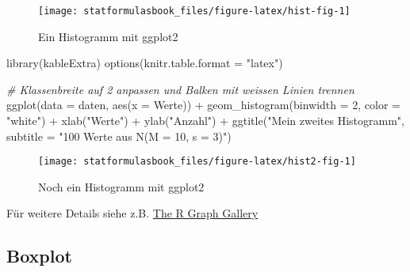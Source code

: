 \documentclass[
]{book}
\newenvironment{Shaded}{\begin{snugshade}}{\end{snugshade}}
\newcommand{\AttributeTok}[1]{\textcolor[rgb]{0.77,0.63,0.00}{#1}}
\newcommand{\CommentTok}[1]{\textcolor[rgb]{0.56,0.35,0.01}{\textit{#1}}}
\newcommand{\DecValTok}[1]{\textcolor[rgb]{0.00,0.00,0.81}{#1}}
\newcommand{\FunctionTok}[1]{\textcolor[rgb]{0.00,0.00,0.00}{#1}}
\newcommand{\NormalTok}[1]{#1}
\newcommand{\SpecialCharTok}[1]{\textcolor[rgb]{0.00,0.00,0.00}{#1}}
\newcommand{\StringTok}[1]{\textcolor[rgb]{0.31,0.60,0.02}{#1}}
\begin{document}
\begin{figure}

{\centering \texttt{[image: statformulasbook\_files/figure-latex/hist-fig-1]} 

}

\caption{Ein Histogramm mit ggplot2}\label{fig:hist-fig}
\end{figure}

\begin{Shaded}
\begin{Highlighting}[]
\FunctionTok{library}\NormalTok{(kableExtra)}
\FunctionTok{options}\NormalTok{(}\AttributeTok{knitr.table.format =} \StringTok{"latex"}\NormalTok{)}
\end{Highlighting}
\end{Shaded}

\begin{Shaded}
\begin{Highlighting}[]
\CommentTok{\# Klassenbreite auf 2 anpassen und Balken mit weissen Linien trennen}
\FunctionTok{ggplot}\NormalTok{(}\AttributeTok{data =}\NormalTok{ daten, }\FunctionTok{aes}\NormalTok{(}\AttributeTok{x =}\NormalTok{ Werte)) }\SpecialCharTok{+}
  \FunctionTok{geom\_histogram}\NormalTok{(}\AttributeTok{binwidth =} \DecValTok{2}\NormalTok{, }\AttributeTok{color =} \StringTok{"white"}\NormalTok{) }\SpecialCharTok{+}
  \FunctionTok{xlab}\NormalTok{(}\StringTok{"Werte"}\NormalTok{) }\SpecialCharTok{+}
  \FunctionTok{ylab}\NormalTok{(}\StringTok{"Anzahl"}\NormalTok{) }\SpecialCharTok{+}
  \FunctionTok{ggtitle}\NormalTok{(}\StringTok{"Mein zweites Histogramm"}\NormalTok{, }\AttributeTok{subtitle =} \StringTok{"100 Werte aus N(M = 10, s = 3)"}\NormalTok{)  }
\end{Highlighting}
\end{Shaded}

\begin{figure}

{\centering \texttt{[image: statformulasbook\_files/figure-latex/hist2-fig-1]} 

}

\caption{Noch ein Histogramm mit ggplot2}\label{fig:hist2-fig}
\end{figure}

Für weitere Details siehe z.B. \href{https://www.r-graph-gallery.com/220-basic-ggplot2-histogram.html}{The R Graph Gallery}

\hypertarget{boxplot}{%
\subsection{Boxplot}\label{boxplot}}
\end{document}
